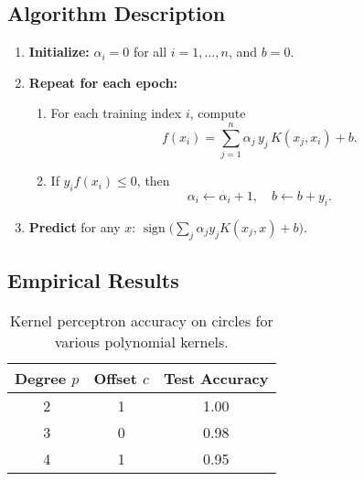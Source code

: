 \documentclass[11pt]{article}
\begin{document}
\subsection{Algorithm Description}
\begin{enumerate}
  \item \textbf{Initialize:} $\alpha_i = 0$ for all $i=1,\dots,n$, and $b=0$.  
  \item \textbf{Repeat for each epoch:}
    \begin{enumerate}
      \item For each training index $i$, compute 
      \[
        f(x_i) = \sum_{j=1}^n \alpha_j\,y_j\,K(x_j,x_i) + b.
      \]
      \item If $y_i f(x_i)\le0$, then
      \[
        \alpha_i \leftarrow \alpha_i + 1,\quad
        b \leftarrow b + y_i.
      \]
    \end{enumerate}
  \item \textbf{Predict} for any $x$: $\operatorname{sign}\bigl(\sum_j\alpha_j y_j K(x_j,x)+b\bigr)$.
\end{enumerate}

\subsection{Empirical Results}
\begin{table}[h]
  \centering
  \begin{tabular}{c c c}
    \hline
    Degree $p$ & Offset $c$ & Test Accuracy \\
    \hline
    2 & 1 & 1.00 \\
    3 & 0 & 0.98 \\
    4 & 1 & 0.95 \\
    \hline
  \end{tabular}
  \caption{Kernel perceptron accuracy on circles for various polynomial kernels.}
\end{table}

\end{document}
